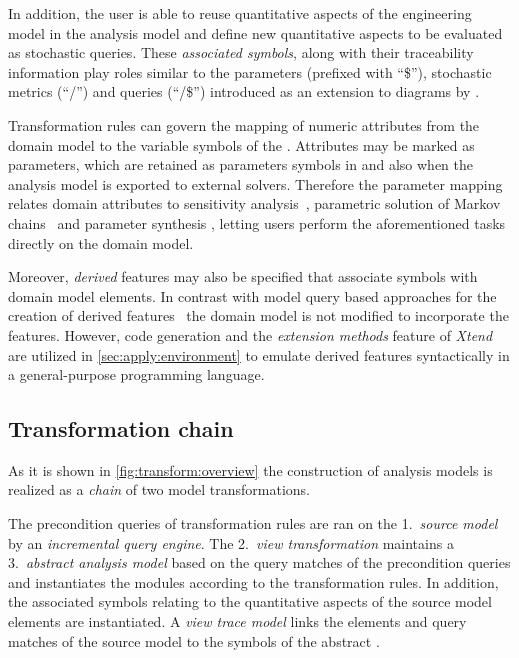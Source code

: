 In addition, the user is able to reuse quantitative aspects of the engineering model in the analysis model and define new quantitative aspects to be evaluated as stochastic queries. These \emph{associated symbols}, along with their traceability information play roles similar to the parameters (prefixed with \enquote{\$}), stochastic metrics (\enquote{/}) and queries (\enquote{/\$}) introduced as an extension to  diagrams by \citet{Bernardi03building}.

Transformation rules can govern the mapping of numeric attributes from the domain model to the variable symbols of the . Attributes may be marked as parameters, which are retained as parameters symbols in  and also when the analysis model is exported to external solvers. Therefore the parameter mapping relates domain attributes to sensitivity analysis~\citep{Blake88sensitivity}, parametric solution of Markov chains~\citep{Hahn11parametric} and parameter synthesis \citep{Quatmann16mdp,Molnar17optimization}, letting users perform the aforementioned tasks directly on the domain model.

Moreover, \emph{derived} features may also be specified that associate  symbols with domain model elements. In contrast with model query based approaches for the creation of derived features~\citep{Rath12derived} the domain model is not modified to incorporate the features. However, code generation and the \emph{extension methods} feature of \emph{Xtend} are utilized in \vref{sec:apply:environment} to emulate derived features syntactically in a general-purpose programming language.

\subsection{Transformation chain}

As it is shown in \vref{fig:transform:overview} the construction of  analysis models is realized as a \emph{chain} of two model transformations.

The precondition queries of transformation rules are ran on the 1.~\emph{source model} by an \emph{incremental query engine}. The 2.~\emph{view transformation} maintains a 3.~\emph{abstract analysis model} based on the query matches of the precondition queries and instantiates the  modules according to the transformation rules. In addition, the associated symbols relating to the quantitative aspects of the source model elements are instantiated. A \emph{view trace model} links the elements and query matches of the source model to the symbols of the abstract .

